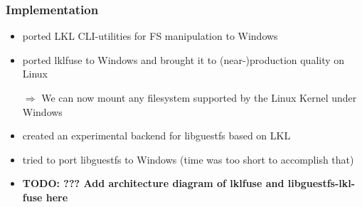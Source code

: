 

\begin{frame}

\frametitle{Implementation}
\begin{itemize}
    \item ported LKL CLI-utilities for FS manipulation to Windows
    \item ported lklfuse to Windows and brought it to (near-)production quality on Linux
    \item[$\Rightarrow$] We can now mount any filesystem supported by the Linux Kernel under Windows
    \item created an experimental backend for libguestfs based on LKL
    \item tried to port libguestfs to Windows (time was too short to accomplish that)
    \item \textbf{TODO: ??? Add architecture diagram of lklfuse and libguestfs-lkl-fuse here }
\end{itemize}


\end{frame}
